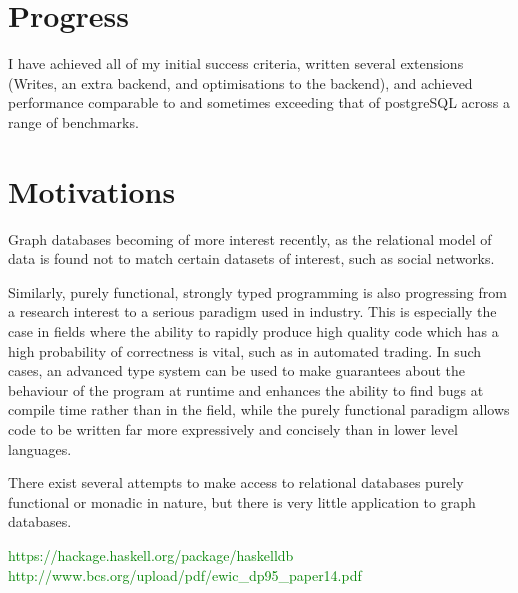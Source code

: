 \documentclass[12pt,a4paper,twoside,openright]{report}
\newcommand\toReference[1]{\textcolor{green}{#1}}
\begin{document}
\section{Progress}

I have achieved all of my initial success criteria, written several extensions (Writes, an extra backend, and optimisations to the backend), and achieved performance comparable to and sometimes exceeding that of postgreSQL across a range of benchmarks.

\section{Motivations}

Graph databases becoming of more interest recently, as the relational model of data is found not to match certain datasets of interest, such as social networks.

Similarly, purely functional, strongly typed programming is also progressing from a research interest to a serious paradigm used in industry. This is especially the case in fields where the ability to rapidly produce high quality code which has a high probability of correctness is vital, such as in automated trading. In such cases, an advanced type system can be used to make guarantees about the behaviour of the program at runtime and enhances the ability to find bugs at compile time rather than in the field, while the purely functional paradigm allows code to be written far more expressively and concisely than in lower level languages.

There exist several attempts to make access to relational databases purely functional or monadic in nature, but there is very little application to  graph databases.
    
    \toReference{https://hackage.haskell.org/package/haskelldb
		  http://www.bcs.org/upload/pdf/ewic_dp95_paper14.pdf}
\end{document}
